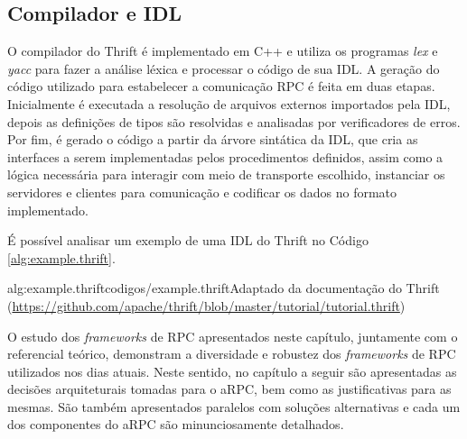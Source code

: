 \subsection{Compilador e IDL}
O compilador do Thrift é implementado em C++ e utiliza os programas \emph{lex} e \emph{yacc} para fazer a análise léxica e processar o código de sua IDL. A geração do código utilizado para estabelecer a comunicação RPC é feita em duas etapas. Inicialmente é executada a resolução de arquivos externos importados pela IDL, depois as definições de tipos são resolvidas e analisadas por verificadores de erros. Por fim, é gerado o código a partir da árvore sintática da IDL, que cria as interfaces a serem implementadas pelos procedimentos definidos, assim como a lógica necessária para interagir com meio de transporte escolhido, instanciar os servidores e clientes para comunicação e codificar os dados no formato implementado.

É possível analisar um exemplo de uma IDL do Thrift no Código \ref{alg:example.thrift}.

 {alg:example.thrift}{codigos/example.thrift}{Adaptado da documentação do Thrift (\url{https://github.com/apache/thrift/blob/master/tutorial/tutorial.thrift})}

O estudo dos \textit{frameworks} de RPC apresentados neste capítulo, juntamente com o referencial teórico, demonstram a diversidade e robustez dos \textit{frameworks} de RPC utilizados nos dias atuais. Neste sentido, no capítulo a seguir são apresentadas as decisões arquiteturais tomadas para o aRPC, bem como as justificativas para as mesmas. São também apresentados paralelos com soluções alternativas e cada um dos componentes do aRPC são minunciosamente detalhados.